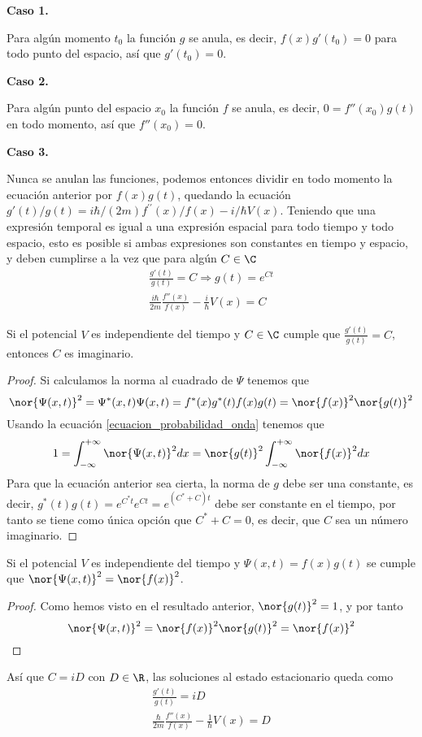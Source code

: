 \textbf{Caso 1.}

Para algún momento $t_0$ la función $g$ se anula, es decir, $f(x)g'(t_0)=0$ para todo punto del espacio, así que $g'(t_0)=0$.

\textbf{Caso 2.}

Para algún punto del espacio $x_0$ la función $f$ se anula, es decir, $0=f''(x_0)g(t)$ en todo momento, así que $f''(x_0)=0$.

\textbf{Caso 3.}

Nunca se anulan las funciones, podemos entonces dividir en todo momento la ecuación anterior por $f(x)g(t)$, quedando la ecuación $g'(t)/g(t)=i\hbar/(2m)f^{\prime\prime}(x)/f(x)-i/\hbar V(x)$. Teniendo que una expresión temporal es igual a una expresión espacial para todo tiempo y todo espacio, esto es posible si ambas expresiones son constantes en tiempo y espacio, y deben cumplirse a la vez que para algún $C\in\C$
\begin{gather*}
\frac{g'(t)}{g(t)}=C\Rightarrow g(t)=e^{Ct}
\\
\frac{i\hbar}{2m}\frac{f''(x)}{f(x)}-\frac{i}{\hbar}V(x)=C
\end{gather*}

\begin{resultado}
	Si el potencial $V$ es independiente del tiempo y $C\in\C$ cumple que $\frac{g'(t)}{g(t)}=C$, entonces $C$ es imaginario.
\end{resultado}
\begin{proof}
	Si calculamos la norma al cuadrado de $\Psi$ tenemos que
	\begin{equation*}
	\nor{\Psi(x,t)}^2=\Psi^*(x,t)\Psi(x,t)=f^*(x)g^*(t)f(x)g(t)=\nor{f(x)}^2\nor{g(t)}^2
	\end{equation*}
	Usando la ecuación \ref{ecuacion_probabilidad_onda} tenemos que
	\begin{equation*}
	1=\int_{-\infty}^{+\infty}\nor{\Psi(x,t)}^2 dx=\nor{g(t)}^2\int_{-\infty}^{+\infty}\nor{f(x)}^2 dx
	\end{equation*}
	Para que la ecuación anterior sea cierta, la norma de $g$ debe ser una constante, es decir, $g^*(t)g(t)=e^{C^*t}e^{Ct}=e^{(C^*+C)t}$ debe ser constante en el tiempo, por tanto se tiene como única opción que $C^*+C=0$, es decir, que $C$ sea un número imaginario.
\end{proof}

\begin{resultado}
Si el potencial $V$ es independiente del tiempo y $\Psi(x,t)=f(x)g(t)$ se cumple que $\nor{\Psi(x,t)}^2=\nor{f(x)}^2$.
\end{resultado}
\begin{proof}
Como hemos visto en el resultado anterior, $\nor{g(t)}^2=1$, y por tanto 
\begin{equation}\label{probabilidad_atemporal}
\nor{\Psi(x,t)}^2=\nor{f(x)}^2\nor{g(t)}^2=\nor{f(x)}^2
\end{equation} 
\end{proof}
Así que $C=iD$ con $D\in\R$, las soluciones al estado estacionario queda como 
\begin{gather*}
\frac{g'(t)}{g(t)}=iD
\\
\frac{\hbar}{2m}\frac{f''(x)}{f(x)}-\frac{1}{\hbar}V(x)=D
\end{gather*}

